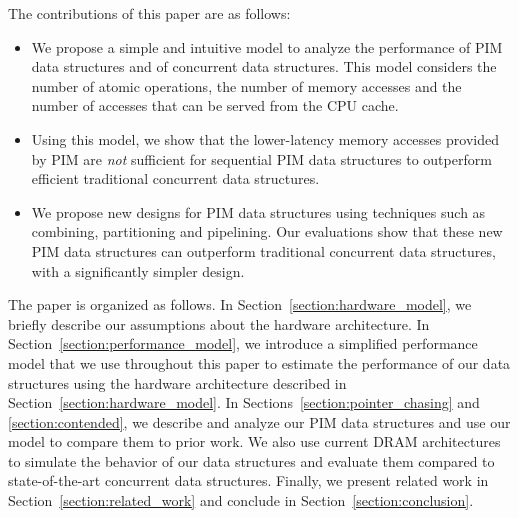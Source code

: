 The contributions of this paper are as follows:
\begin{itemize}
\item We propose a simple and intuitive model to analyze the
  performance of PIM data structures and of concurrent data
  structures. This model considers the number of atomic operations,
  the number of memory accesses and the number of accesses that can be
  served from the CPU cache.
\item Using this model, we show that the lower-latency memory accesses
  provided by PIM are \emph{not} sufficient for sequential PIM data
  structures to outperform efficient traditional concurrent data
  structures.
 \item We propose new designs for PIM data structures using techniques
   such as combining, partitioning and pipelining.  Our evaluations
   show that these new PIM data structures can outperform traditional
   concurrent data structures, with a significantly simpler design.
\end{itemize}

The paper is organized as follows. In
Section~\ref{section:hardware_model}, we briefly describe our
assumptions about the hardware architecture.  In
Section~\ref{section:performance_model}, we introduce a simplified
performance model that we use throughout this paper to estimate the
performance of our data structures using the hardware architecture
described in Section~\ref{section:hardware_model}.  In
Sections~\ref{section:pointer_chasing} and \ref{section:contended}, we
describe and analyze our PIM data structures and use our model to
compare them to prior work.  We also use current DRAM architectures to
simulate the behavior of our data structures and evaluate them
compared to state-of-the-art concurrent data structures.  Finally, we
present related work in Section~\ref{section:related_work} and
conclude in Section~\ref{section:conclusion}.

